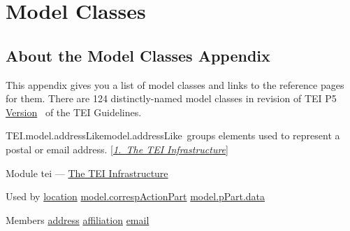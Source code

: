 
\section[{Model Classes}]{Model Classes}\label{REF-CLASSES-MODEL}
\subsection[{About the Model Classes Appendix}]{About the Model Classes Appendix}\par
This appendix gives you a list of model classes and links to the reference pages for them. There are 124 distinctly-named model classes in revision  of TEI P5 \hyperref[ABTEI4]{Version}  of the TEI Guidelines.
\begin{reflist}
\item[]\begin{specHead}{TEI.model.addressLike}{model.addressLike} groups elements used to represent a postal or email address. [\textit{\hyperref[ST]{1.\ The TEI Infrastructure}}]\end{specHead} 
    \item[{Module}]
  tei — \hyperref[ST]{The TEI Infrastructure}
    \item[{Used by}]
  \hyperref[TEI.location]{location} \hyperref[TEI.model.correspActionPart]{model.correspActionPart} \hyperref[TEI.model.pPart.data]{model.pPart.data}
    \item[{Members}]
  \hyperref[TEI.address]{address} \hyperref[TEI.affiliation]{affiliation} \hyperref[TEI.email]{email}
\end{reflist}  
